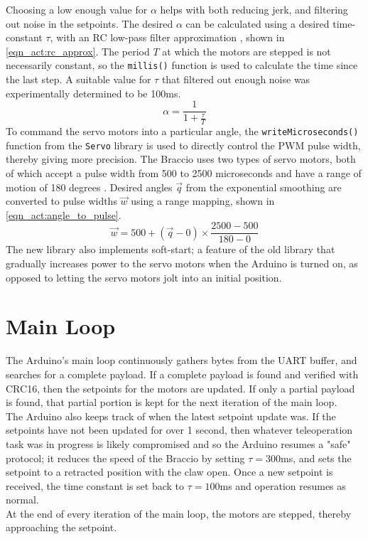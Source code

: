 \newpage
Choosing a low enough value for $\alpha$ helps with both reducing jerk, and filtering out noise in the setpoints. The desired $\alpha$ can be calculated using a desired time-constant $\tau$, with an RC low-pass filter approximation \cite{bib:exp_smoothing}, shown in \autoref{eqn_act:rc_approx}. The period $T$ at which the motors are stepped is not necessarily constant, so the \verb|millis()| function is used to calculate the time since the last step. A suitable value for $\tau$ that filtered out enough noise was experimentally determined to be 100ms.
\begin{equation}
    \alpha=\frac{1}{1+\frac{\tau}{T}}
    \label{eqn_act:rc_approx}
\end{equation}
To command the servo motors into a particular angle, the \verb|writeMicroseconds()| function from the \verb|Servo| library is used to directly control the PWM pulse width, thereby giving more precision. The Braccio uses two types of servo motors, both of which accept a pulse width from 500 to 2500 microseconds and have a range of motion of 180 degrees \cite{bib:springrc_sr311}\cite{bib:springrc_sr431}. Desired angles $\vec{q}$ from the exponential smoothing are converted to pulse widths $\vec{w}$ using a range mapping, shown in \autoref{eqn_act:angle_to_pulse}.
\begin{equation}
    \vec{w}=500+(\vec{q}-0)\times\frac{2500-500}{180-0}
    \label{eqn_act:angle_to_pulse}
\end{equation}
The new library also implements soft-start; a feature of the old library that gradually increases power to the servo motors when the Arduino is turned on, as opposed to letting the servo motors jolt into an initial position.

\section{Main Loop}
The Arduino's main loop continuously gathers bytes from the UART buffer, and searches for a complete payload. If a complete payload is found and verified with CRC16, then the setpoints for the motors are updated. If only a partial payload is found, that partial portion is kept for the next iteration of the main loop.\\
The Arduino also keeps track of when the latest setpoint update was. If the setpoints have not been updated for over 1 second, then whatever teleoperation task was in progress is likely compromised and so the Arduino resumes a "safe" protocol; it reduces the speed of the Braccio by setting $\tau=300$ms, and sets the setpoint to a retracted position with the claw open. Once a new setpoint is received, the time constant is set back to $\tau=100$ms and operation resumes as normal.\\
At the end of every iteration of the main loop, the motors are stepped, thereby approaching the setpoint.

